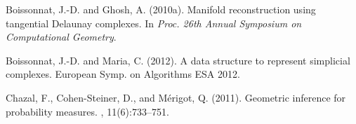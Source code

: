 % 
% 

\vspace{-4mm}

\begin{thebibliography}{}


{\small %

\vspace{-2.4mm}

Boissonnat, J.-D. and Ghosh, A. (2010a).
\newblock Manifold reconstruction using tangential {Delaunay} complexes.
\newblock In {\em Proc. 26th Annual Symposium on Computational Geometry}.

\vspace{-2.4mm}



Boissonnat, J.-D. and Maria, C. (2012).
\newblock A data structure to represent simplicial complexes.
\newblock European Symp. on Algorithms ESA 2012.
\vspace{-2.4mm}

Chazal, F., Cohen-Steiner, D., and M\'erigot, Q. (2011).
\newblock Geometric inference for probability measures.
,
  11(6):733--751.
\vspace{-2.4mm}

}
\end{thebibliography}
